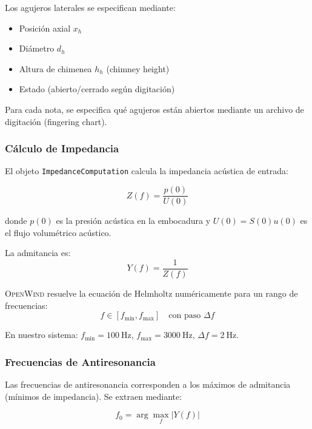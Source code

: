 \documentclass[12pt,a4paper,twocolumn]{article}
\newcommand{\openwind}{\textsc{OpenWind}}
\newcommand{\impedance}{Z}
\newcommand{\admittance}{Y}
\newcommand{\freqzero}{f_0}
\begin{document}
Los agujeros laterales se especifican mediante:
\begin{itemize}
    \item Posición axial $x_h$
    \item Diámetro $d_h$
    \item Altura de chimenea $h_h$ (chimney height)
    \item Estado (abierto/cerrado según digitación)
\end{itemize}

Para cada nota, se especifica qué agujeros están abiertos mediante un archivo de digitación (fingering chart).

\subsubsection{Cálculo de Impedancia}

El objeto \texttt{ImpedanceComputation} calcula la impedancia acústica de entrada:

\begin{equation}
\impedance(f) = \frac{p(0)}{U(0)}
\label{eq:impedancia}
\end{equation}

donde $p(0)$ es la presión acústica en la embocadura y $U(0) = S(0) u(0)$ es el flujo volumétrico acústico.

La admitancia es:
\begin{equation}
\admittance(f) = \frac{1}{\impedance(f)}
\label{eq:admittancia}
\end{equation}

\openwind{} resuelve la ecuación de Helmholtz numéricamente para un rango de frecuencias:
\begin{equation}
f \in [f_{\min}, f_{\max}] \quad \text{con paso } \Delta f
\label{eq:rango_frecuencias}
\end{equation}

En nuestro sistema: $f_{\min} = \SI{100}{\hertz}$, $f_{\max} = \SI{3000}{\hertz}$, $\Delta f = \SI{2}{\hertz}$.

\subsubsection{Frecuencias de Antiresonancia}

Las frecuencias de antiresonancia corresponden a los máximos de admitancia (mínimos de impedancia). Se extraen mediante:

\begin{equation}
\freqzero = \arg\max_f |\admittance(f)|
\label{eq:antiresonancia_1}
\end{equation}
\end{document}
